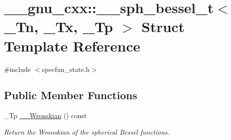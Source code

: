 \hypertarget{struct____gnu__cxx_1_1____sph__bessel__t}{}\section{\+\_\+\+\_\+gnu\+\_\+cxx\+:\+:\+\_\+\+\_\+sph\+\_\+bessel\+\_\+t$<$ \+\_\+\+Tn, \+\_\+\+Tx, \+\_\+\+Tp $>$ Struct Template Reference}
\label{struct____gnu__cxx_1_1____sph__bessel__t}


{\ttfamily \#include $<$specfun\+\_\+state.\+h$>$}

\subsection*{Public Member Functions}
\begin{DoxyCompactItemize}
\item 
\+\_\+\+Tp \hyperlink{struct____gnu__cxx_1_1____sph__bessel__t_a3f8ba1e4627ffc4a67d2310ec9207f3f}{\+\_\+\+\_\+\+Wronskian} () const 
\begin{DoxyCompactList}\small\item\em Return the Wronskian of the spherical Bessel functions. \end{DoxyCompactList}\end{DoxyCompactItemize}
